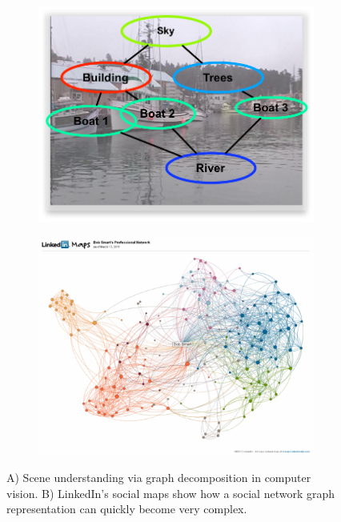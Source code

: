 \begin{figure}[ht]
    \begin{subfigure}{.45\linewidth}
        \centering
        \includegraphics[width=\linewidth]{Figures/scene}
        \caption{}
        \label{fig:scene}
    \end{subfigure}
    \begin{subfigure}{.45\linewidth}
        \centering
        \includegraphics[width=\linewidth]{Figures/linkedin-social-maps}
        \caption{}
        \label{fig:network}
    \end{subfigure}
\caption{A) Scene understanding via graph decomposition in computer vision. B)
        LinkedIn's social maps show how a social network graph representation
        can quickly become very complex.}
\end{figure}


